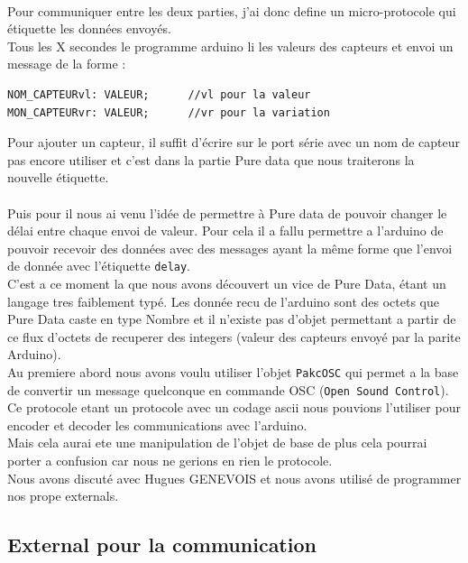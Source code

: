\documentclass[a4paper, titlepage, oneside, 12pt]{article}%
\begin{document}
\paragraph{}
Pour communiquer entre les deux parties, j'ai donc define un micro-protocole qui étiquette les données envoyés.\\
Tous les X secondes le programme arduino li les valeurs des capteurs et envoi un message de la forme :
\begin{lstlisting}
NOM_CAPTEURvl: VALEUR;		//vl pour la valeur
MON_CAPTEURvr: VALEUR;		//vr pour la variation
\end{lstlisting}

Pour ajouter un capteur, il suffit d'écrire sur le port série avec un nom de capteur pas encore utiliser et c'est dans la partie Pure data que nous traiterons la nouvelle étiquette.

\paragraph{}
Puis pour il nous ai venu l'idée de permettre à Pure data de pouvoir changer le délai entre chaque envoi de valeur. 
Pour cela il a fallu permettre a l'arduino de pouvoir recevoir des données avec des messages ayant la même forme que l'envoi de donnée avec l'étiquette \texttt{delay}.\\
C'est a ce moment la que nous avons découvert un vice de Pure Data, étant un langage tres faiblement typé. Les donnée recu de l'arduino sont des octets que Pure Data caste en type Nombre et il n'existe pas d'objet permettant a partir de ce flux d'octets de recuperer des integers (valeur des capteurs envoyé par la parite Arduino).\\

Au premiere abord nous avons voulu utiliser l'objet \texttt{PakcOSC} qui permet a la base de convertir un message quelconque en commande OSC (\texttt{Open Sound Control}). Ce protocole etant un protocole avec un codage ascii nous pouvions l'utiliser pour encoder et decoder les communications avec l'arduino. \\
Mais cela aurai ete une manipulation de l'objet de base de plus cela pourrai porter a confusion car nous ne gerions en rien le protocole.\\
Nous avons discuté avec Hugues GENEVOIS et nous avons utilisé de programmer nos prope externals.

\subsection{External pour la communication}
\end{document}
